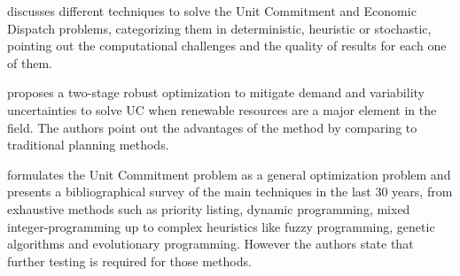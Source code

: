 \documentclass[12pt,LUDisStyle,twosided]{book}
\begin{document}
\begin{table}[h!]
\centering
\caption{Optimal Power Flow Categories.}
\end{table}


\citeauthor{yamin} \cite{yamin} discusses different techniques to solve the Unit Commitment and Economic Dispatch problems, categorizing them in deterministic, heuristic or stochastic, pointing out the computational challenges and the quality of results for each one of them. 

\citeauthor{bertsimas} \cite{bertsimas} proposes a two-stage robust optimization to mitigate demand and variability uncertainties to solve UC when renewable resources are a major element in the field. The authors point out the advantages of the method by comparing to traditional planning methods. 

\citeauthor{padhy} \cite{padhy} formulates the Unit Commitment problem as a general optimization problem and presents a bibliographical survey of the main techniques in the last 30 years, from exhaustive methods such as priority listing, dynamic programming, mixed integer-programming up to complex heuristics like fuzzy programming, genetic algorithms and evolutionary programming. However the authors state that further testing is required for those methods.
\end{document}
